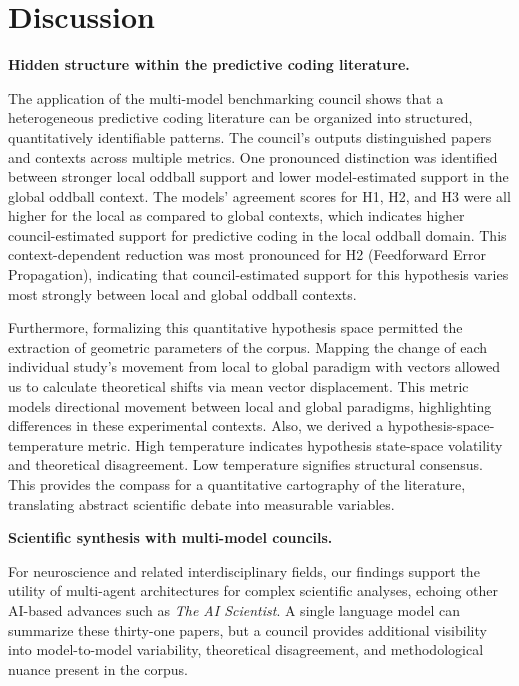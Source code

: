 \documentclass[12pt]{article}
\providecommand{\DIFaddend}{} %
\DeclareRobustCommand{\DIFaddend}{\DIFOaddend \let\includegraphics\DIFOincludegraphics} %
\begin{document}
\DIFaddend \section{Discussion}\label{discussion}

\noindent\textbf{Hidden structure within the predictive coding literature.}

The application of the multi-model benchmarking council shows that a heterogeneous predictive coding literature can be organized into structured, quantitatively identifiable patterns. The council's outputs distinguished papers and contexts across multiple metrics. One pronounced distinction was identified between stronger local oddball support and lower model-estimated support in the global oddball context. The models' agreement scores for H1, H2, and H3 were all higher for the local as compared to global contexts, which indicates higher council-estimated support for predictive coding in the local oddball domain. This context-dependent reduction was most pronounced for H2 (Feedforward Error Propagation), indicating that council-estimated support for this hypothesis varies most strongly between local and global oddball contexts.

Furthermore, formalizing this quantitative hypothesis space permitted the extraction of geometric parameters of the corpus. Mapping the change of each individual study's movement from local to global paradigm with vectors allowed us to calculate theoretical shifts via mean vector displacement. This metric models directional movement between local and global paradigms, highlighting differences in these experimental contexts. Also, we derived a hypothesis-space-temperature metric. High temperature indicates hypothesis state-space volatility and theoretical disagreement. Low temperature signifies structural consensus. This provides the compass for a quantitative cartography of the literature, translating abstract scientific debate into measurable variables.

\noindent\textbf{Scientific synthesis with multi-model councils.}

For neuroscience and related interdisciplinary fields, our findings support the utility of multi-agent architectures for complex scientific analyses, echoing other AI-based advances such as \emph{The AI Scientist}\cite{ref45}. A single language model can summarize these thirty-one papers, but a council provides additional visibility into model-to-model variability, theoretical disagreement, and methodological nuance present in the corpus.
\end{document}
